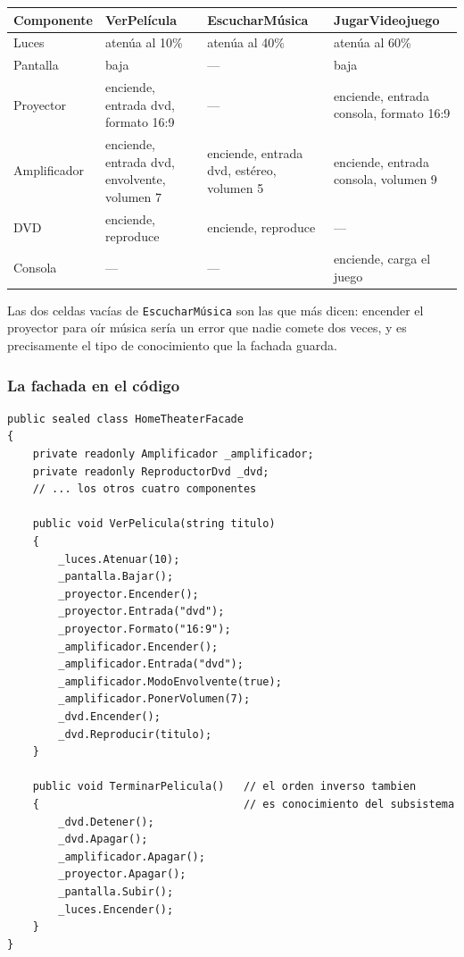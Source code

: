 \begin{table}[h!]
    \centering
    \small
    \begin{tabular}{p{2.3cm}p{3.9cm}p{3.5cm}p{3.9cm}}
        \toprule
        \textbf{Componente} & \textbf{VerPelícula} & \textbf{EscucharMúsica}
        & \textbf{JugarVideojuego} \\
        \midrule
        Luces        & atenúa al 10\% & atenúa al 40\% & atenúa al 60\% \\
        \addlinespace
        Pantalla     & baja & --- & baja \\
        \addlinespace
        Proyector    & enciende, entrada dvd, formato 16:9 & ---
                     & enciende, entrada consola, formato 16:9 \\
        \addlinespace
        Amplificador & enciende, entrada dvd, envolvente, volumen 7
                     & enciende, entrada dvd, estéreo, volumen 5
                     & enciende, entrada consola, volumen 9 \\
        \addlinespace
        DVD          & enciende, reproduce & enciende, reproduce & --- \\
        \addlinespace
        Consola      & --- & --- & enciende, carga el juego \\
        \bottomrule
    \end{tabular}
\end{table}

Las dos celdas vacías de \texttt{EscucharMúsica} son las que más dicen: encender el proyector
para oír música sería un error que nadie comete dos veces, y es precisamente el tipo de
conocimiento que la fachada guarda.

\subsubsection*{La fachada en el código}

{\small
\begin{verbatim}
public sealed class HomeTheaterFacade
{
    private readonly Amplificador _amplificador;
    private readonly ReproductorDvd _dvd;
    // ... los otros cuatro componentes

    public void VerPelicula(string titulo)
    {
        _luces.Atenuar(10);
        _pantalla.Bajar();
        _proyector.Encender();
        _proyector.Entrada("dvd");
        _proyector.Formato("16:9");
        _amplificador.Encender();
        _amplificador.Entrada("dvd");
        _amplificador.ModoEnvolvente(true);
        _amplificador.PonerVolumen(7);
        _dvd.Encender();
        _dvd.Reproducir(titulo);
    }

    public void TerminarPelicula()   // el orden inverso tambien
    {                                // es conocimiento del subsistema
        _dvd.Detener();
        _dvd.Apagar();
        _amplificador.Apagar();
        _proyector.Apagar();
        _pantalla.Subir();
        _luces.Encender();
    }
}
\end{verbatim}
}

